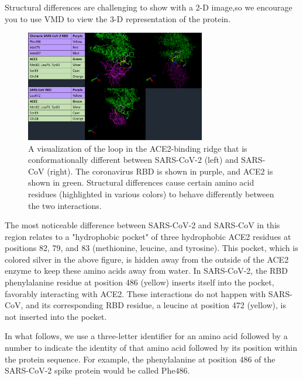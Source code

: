 {{Structural differences are challenging to show with a 2-D image,so we encourage you to use VMD to view the 3-D representation of the protein. 

\begin{qbox}\end{qbox}

\begin{figure}[h]
	\centering
	\mySfFamily
	\includegraphics[width = 0.7\textwidth]{../images/Ridge.png}
	\caption{A visualization of the loop in the ACE2-binding ridge that is conformationally different between SARS-CoV-2 (left) and SARS-CoV (right). The coronavirus RBD is shown in purple, and ACE2 is shown in green. Structural differences cause certain amino acid residues (highlighted in various colors) to behave differently between the two interactions.}
	\label{fig:Ridge}
\end{figure}

The most noticeable difference between SARS-CoV-2 and SARS-CoV in this region relates to a "hydrophobic pocket" of three hydrophobic ACE2 residues at positions 82, 79, and 83 (methionine, leucine, and tyrosine). This pocket, which is colored silver in the above figure, is hidden away from the outside of the ACE2 enzyme to keep these amino acids away from water. In SARS-CoV-2, the RBD phenylalanine residue at position 486 (yellow) inserts itself into the pocket, favorably interacting with ACE2. These interactions do not happen with SARS-CoV, and its corresponding RBD residue, a leucine at position 472 (yellow), is not inserted into the pocket.

In what follows, we use a three-letter identifier for an amino acid followed by a number to indicate the identity of that amino acid followed by its position within the protein sequence. For example, the phenylalanine at position 486 of the SARS-CoV-2 spike protein would be called Phe486.

}}
